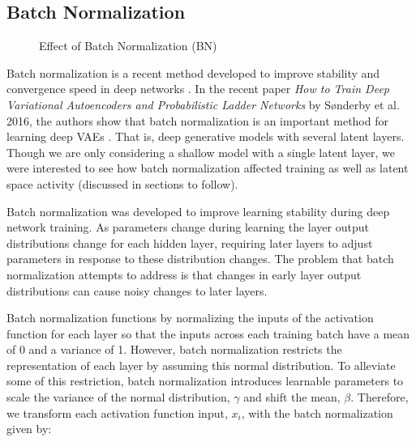 \documentclass{article} %
\numberwithin{figure}{section}
\begin{document}
\subsection{Batch Normalization}
\begin{wrapfigure}{l}{0.5\textwidth}
    \resizebox{\linewidth}{!}{}
    \caption{Effect of Batch Normalization (BN)}
    \label{fig:bncost}
\end{wrapfigure}

Batch normalization is a recent method developed to improve stability and convergence speed in deep networks \cite{Ioffe2015}. In the recent paper \textit{How to Train Deep Variational Autoencoders and Probabilistic Ladder Networks} by S\o nderby et al. 2016, the authors show that batch normalization is an important method for learning deep VAEs \cite{Sonderby2016}. That is, deep generative models with several latent layers. Though we are only considering a shallow model with a single latent layer, we were interested to see how batch normalization affected training as well as latent space activity (discussed in sections to follow).
\par Batch normalization was developed to improve learning stability during deep network training. As parameters change during learning the layer output distributions change for each hidden layer, requiring later layers to adjust parameters in response to these distribution changes. The problem that batch normalization attempts to address is that changes in early layer output distributions can cause noisy changes to later layers. 
\par Batch normalization functions by normalizing the inputs of the activation function for each layer so that the inputs across each training batch have a mean of 0 and a variance of 1. However, batch normalization restricts the representation of each layer by assuming this normal distribution. To alleviate some of this restriction, batch normalization introduces learnable parameters to scale the variance of the normal distribution, $\gamma$ and shift the mean, $\beta$. Therefore, we transform each activation function input, $x_i$, with the batch normalization given by:
\end{document}
